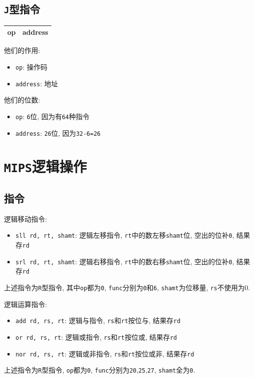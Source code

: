 \subsection{\texttt{J}型指令}
\begin{table}[H]
\centering
\begin{tabularx}{\textwidth}{|Z|Z|}
\hline
op & address \\
\hline
\end{tabularx}
\end{table}\par
他们的作用:
\begin{itemize}
\item \verb|op|: 操作码
\item \verb|address|: 地址
\end{itemize}\par
他们的位数:
\begin{itemize}
\item \verb|op|: \verb|6|位, 因为有\verb|64|种指令
\item \verb|address|: \verb|26|位, 因为\verb|32-6=26|
\end{itemize}
\section{\texttt{MIPS}逻辑操作}
\subsection{指令}
逻辑移动指令:
\begin{itemize}
\item \verb|sll rd, rt, shamt|: 逻辑左移指令, \verb|rt|中的数左移\verb|shamt|位, 空出的位补\verb|0|, 结果存\verb|rd|
\item \verb|srl rd, rt, shamt|: 逻辑右移指令, \verb|rt|中的数右移\verb|shamt|位, 空出的位补\verb|0|, 结果存\verb|rd|
\end{itemize}\par
上述指令为\verb|R|型指令, 其中\verb|op|都为\verb|0|, \verb|func|分别为\verb|0|和\verb|6|, \verb|shamt|为位移量, \verb|rs|不使用为0. \par
逻辑运算指令:
\begin{itemize}
\item \verb|add rd, rs, rt|: 逻辑与指令, \verb|rs|和\verb|rt|按位与, 结果存\verb|rd|
\item \verb|or rd, rs, rt|: 逻辑或指令, \verb|rs|和\verb|rt|按位或, 结果存\verb|rd|
\item \verb|nor rd, rs, rt|: 逻辑或非指令, \verb|rs|和\verb|rt|按位或非, 结果存\verb|rd|
\end{itemize}\par
上述指令为\verb|R|型指令, \verb|op|都为\verb|0|, \verb|func|分别为\verb|20|,\verb|25|,\verb|27|, \verb|shamt|全为\verb|0|.

